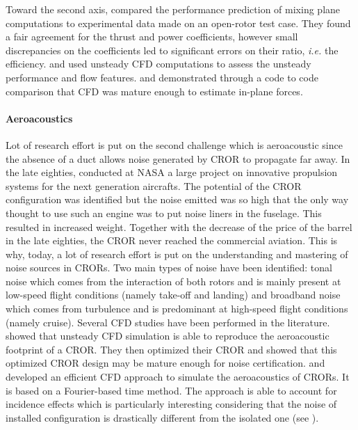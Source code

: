 Toward the second axis, \citet{Zachariadis2011}
compared the performance prediction of mixing plane computations
to experimental data made on an open-rotor test case.
They found a fair agreement for the thrust and power coefficients, however
small discrepancies on the coefficients led to significant errors on their ratio,
\emph{i.e.} the efficiency.
\citet{Vion2011} and \citet{Stuermer2008} used unsteady
CFD computations to assess the unsteady performance and flow features.
\citet{Stuermer2008} and \citet{Francois2013} demonstrated through a code to code comparison
that CFD was mature enough to estimate in-plane forces.

\paragraph{Aeroacoustics}
Lot of research effort is put on the second challenge which
is aeroacoustic since the absence of a duct allows noise generated
by CROR to propagate far away.
In the late eighties, \citet{Hager1988}
conducted at NASA a large project on innovative propulsion systems for the
next generation aircrafts. The potential of the CROR configuration
was identified but the noise emitted was so high that the only way
thought to use such an engine was to put noise liners in the fuselage. This resulted in 
increased weight. Together with the decrease of the price of the
barrel in the late eighties, the CROR never reached the commercial
aviation. This is why, today, a lot of research effort is put on the
understanding and mastering of noise sources in CRORs.
Two main types of noise have been identified: tonal noise which comes from
the interaction of both rotors and is mainly present at low-speed flight conditions 
(namely take-off and landing)
and broadband noise which comes from turbulence and is predominant
at high-speed flight conditions (namely cruise).
Several CFD studies have been performed in the literature.
\citet{Peters2012} showed that unsteady CFD simulation is able
to reproduce the aeroacoustic footprint of a CROR. They then optimized
their CROR and showed that this optimized CROR design may be mature enough
for noise certification. \citet{Hoffer2012} and \citet{Ferrante2013}
developed an efficient CFD approach to simulate the aeroacoustics of CRORs.
It is based on a Fourier-based time method. The approach is able to
account for incidence effects which is particularly interesting
considering that the noise of installed configuration is drastically
different from the isolated one (see \citet{Hager1988}).

